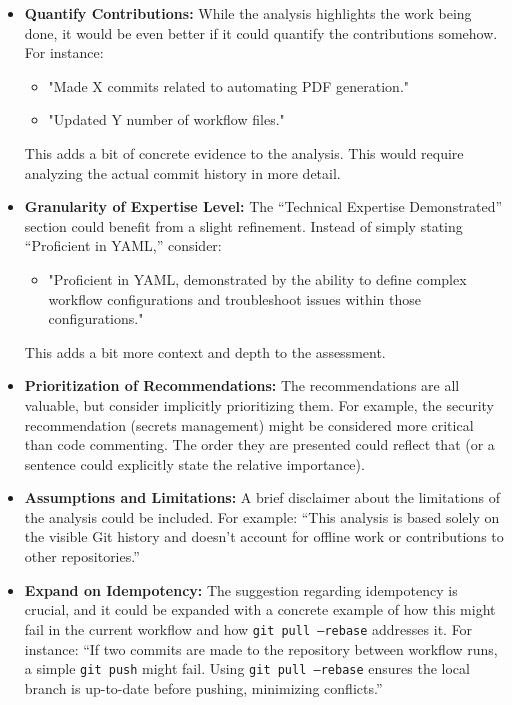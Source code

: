 \documentclass{article}
\begin{document}
\begin{itemize}
\begin{itemize}
    \item \textbf{Quantify Contributions:} While the analysis highlights the work being done, it would be even better if it could quantify the contributions somehow.  For instance:
    \begin{itemize}
        \item "Made X commits related to automating PDF generation."
        \item "Updated Y number of workflow files."
    \end{itemize}
    This adds a bit of concrete evidence to the analysis.  This would require analyzing the actual commit history in more detail.
    \item \textbf{Granularity of Expertise Level:} The ``Technical Expertise Demonstrated'' section could benefit from a slight refinement. Instead of simply stating ``Proficient in YAML,'' consider:
    \begin{itemize}
        \item "Proficient in YAML, demonstrated by the ability to define complex workflow configurations and troubleshoot issues within those configurations."
    \end{itemize}
    This adds a bit more context and depth to the assessment.
    \item \textbf{Prioritization of Recommendations:} The recommendations are all valuable, but consider implicitly prioritizing them.  For example, the security recommendation (secrets management) might be considered more critical than code commenting.  The order they are presented could reflect that (or a sentence could explicitly state the relative importance).
    \item \textbf{Assumptions and Limitations:} A brief disclaimer about the limitations of the analysis could be included.  For example: ``This analysis is based solely on the visible Git history and doesn't account for offline work or contributions to other repositories.''
    \item \textbf{Expand on Idempotency:} The suggestion regarding idempotency is crucial, and it could be expanded with a concrete example of how this might fail in the current workflow and how \texttt{git pull --rebase} addresses it.  For instance: ``If two commits are made to the repository between workflow runs, a simple \texttt{git push} might fail. Using \texttt{git pull --rebase} ensures the local branch is up-to-date before pushing, minimizing conflicts.''
\end{itemize}


\end{itemize}
\end{document}
